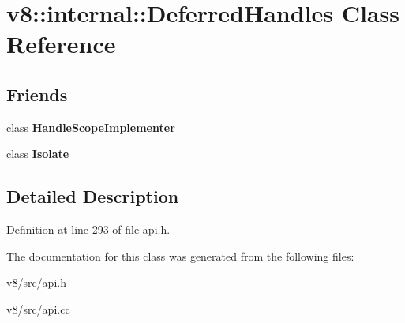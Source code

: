 \hypertarget{classv8_1_1internal_1_1DeferredHandles}{}\section{v8\+:\+:internal\+:\+:Deferred\+Handles Class Reference}
\label{classv8_1_1internal_1_1DeferredHandles}
\subsection*{Friends}
\begin{DoxyCompactItemize}
\item 
\mbox{\label{classv8_1_1internal_1_1DeferredHandles_a4212b6d1addb496cb92d67a2e399a1f3}} 
class {\bfseries Handle\+Scope\+Implementer}
\item 
\mbox{\label{classv8_1_1internal_1_1DeferredHandles_aba4f0964bdacf2bbf62cf876e5d28d0a}} 
class {\bfseries Isolate}
\end{DoxyCompactItemize}


\subsection{Detailed Description}


Definition at line 293 of file api.\+h.



The documentation for this class was generated from the following files\+:\begin{DoxyCompactItemize}
\item 
v8/src/api.\+h\item 
v8/src/api.\+cc\end{DoxyCompactItemize}
